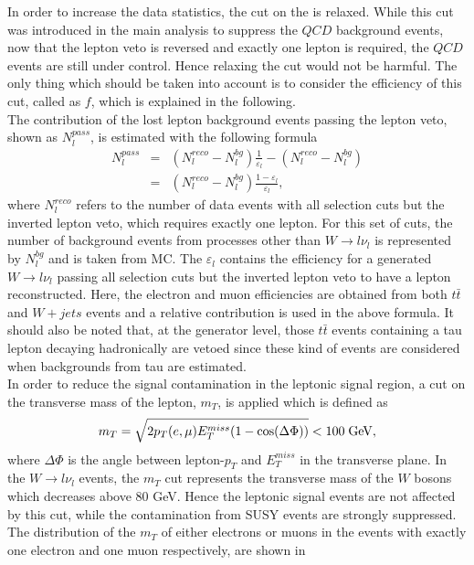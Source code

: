 In order to increase the data statistics, the cut on the 
\mindphifour is relaxed. While this cut was introduced in the main analysis to suppress the $QCD$ background events, now that 
the lepton veto is reversed and exactly one lepton is required, the $QCD$ events are still under control. 
Hence relaxing the \mindphifour cut would not be harmful. The only thing which should be taken into account 
is to consider the efficiency of this cut, called as $f$, which is explained in the following.\\
The contribution of the lost lepton background events passing the lepton veto, shown as $N_l^{pass}$, is estimated with the following formula
\begin{eqnarray} 
N_l^{pass}&=&(N_l^{reco}-N_l^{bg})\frac{1}{\varepsilon_l}-(N_l^{reco}-N_l^{bg})\\\nonumber
&=&(N_l^{reco}-N_l^{bg})\frac{1-\varepsilon_l}{\varepsilon_l},\nonumber
\end{eqnarray}
where $N_l^{reco}$ refers to the number of data events with all selection cuts but the inverted 
lepton veto, which requires exactly one lepton. For this set of cuts, the number of background events from processes 
other than $W\rightarrow l\nu_l$ is represented by $N_l^{bg}$ and is taken from MC. The $\varepsilon_l$ contains 
the efficiency for a generated $W\rightarrow l\nu_l$ passing all selection cuts but the inverted lepton veto to have a 
lepton reconstructed. Here, the electron and muon efficiencies are obtained from both $t\bar t$ and $W+jets$ events and a relative contribution is used in the above formula. It should also be noted that, at the generator level, those $t\bar t$ events containing a tau lepton decaying hadronically are vetoed since these kind of events are considered when backgrounds from tau are estimated.\\ 
In order to reduce the signal contamination in the leptonic signal region, a cut on the transverse mass of the 
lepton, $m_T$, is applied which is defined as
$$m_T=\sqrt{2p_T(e,\mu)E_T^{miss}(1-\cos(\Delta\Phi))} < 100\; \rm GeV,$$
where $\Delta\Phi$ is the angle between lepton-$p_T$ and $E_T^{miss}$ in the transverse plane. 
In the $W\rightarrow l\nu_l$ events, the $m_T$ cut represents the transverse mass of 
the $W$ bosons which decreases above $80$ GeV. Hence the leptonic signal events are not 
affected by this cut, while the contamination from SUSY events are strongly suppressed. The 
distribution of the $m_T$ of either electrons or muons in the events with exactly one electron and one muon respectively, are shown in
